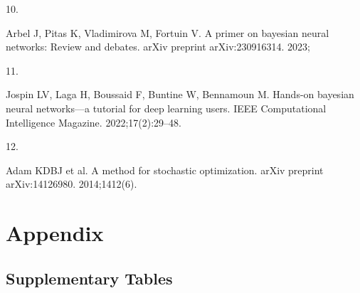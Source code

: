 \documentclass[
  a4paper,
]{scrreprt}
\newlength{\cslhangindent}
\newlength{\csllabelwidth}
\newenvironment{CSLReferences}[2] %
 {\begin{list}{}{%
  \setlength{\itemindent}{0pt}
  \setlength{\leftmargin}{0pt}
  \setlength{\parsep}{0pt}
  \ifodd #1
   \setlength{\leftmargin}{\cslhangindent}
   \setlength{\itemindent}{-1\cslhangindent}
  \fi
  \setlength{\itemsep}{#2\baselineskip}}}
 {\end{list}}
\newcommand{\CSLLeftMargin}[1]{\parbox[t]{\csllabelwidth}{\strut#1\strut}}
\newcommand{\CSLRightInline}[1]{\parbox[t]{\linewidth - \csllabelwidth}{\strut#1\strut}}
\begin{document}
\begin{CSLReferences}{0}{1}
\CSLLeftMargin{10. }%
\CSLRightInline{Arbel J, Pitas K, Vladimirova M, Fortuin V. A primer on
bayesian neural networks: Review and debates. arXiv preprint
arXiv:230916314. 2023; }

\CSLLeftMargin{11. }%
\CSLRightInline{Jospin LV, Laga H, Boussaid F, Buntine W, Bennamoun M.
Hands-on bayesian neural networks---a tutorial for deep learning users.
IEEE Computational Intelligence Magazine. 2022;17(2):29--48. }

\CSLLeftMargin{12. }%
\CSLRightInline{Adam KDBJ et al. A method for stochastic optimization.
arXiv preprint arXiv:14126980. 2014;1412(6). }

\end{CSLReferences}


\chapter*{Appendix}\label{appendix}


\section*{Supplementary Tables}\label{supplementary-tables}

\end{document}
